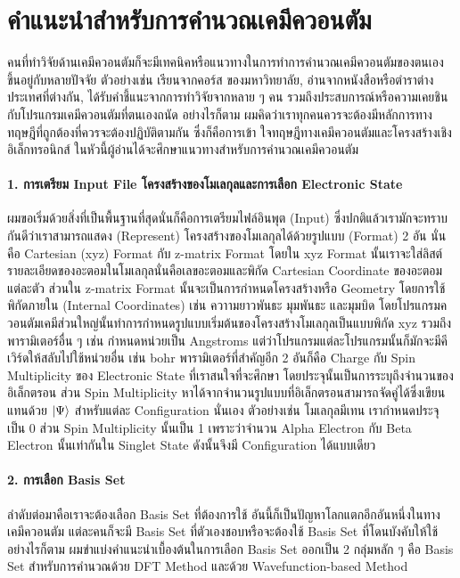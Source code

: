 \section{คำแนะนำสำหรับการคำนวณเคมีควอนตัม}

คนที่ทำวิจัยด้านเคมีควอนตัมก็จะมีเทคนิคหรือแนวทางในการทำการคำนวณเคมีควอนตัมของตนเอง ขึ้นอยู่กับหลายปัจจัย ตัวอย่างเช่น เรียนจากคอร์ส%
ของมหาวิทยาลัย, อ่านจากหนังสือหรือตำราต่างประเทศที่ต่างกัน, ได้รับคำชี้แนะจากการทำวิจัยจากหลาย ๆ คน รวมถึงประสบการณ์หรือความเคยชิน%
กับโปรแกรมเคมีควอนตัมที่ตนเองถนัด อย่างไรก็ตาม ผมคิดว่าเราทุกคนควรจะต้องมีหลักการทางทฤษฎีที่ถูกต้องที่ควรจะต้องปฏิบัติตามกัน ซึ่งก็คือการเข้า%
ใจทฤษฎีทางเคมีควอนตัมและโครงสร้างเชิงอิเล็กทรอนิกส์ ในหัวนี้ผู้อ่านได้จะศึกษาแนวทางสำหรับการคำนวณเคมีควอนตัม

\paragraph{1. การเตรียม Input File โครงสร้างของโมเลกุลและการเลือก Electronic State}
ผมขอเริ่มด้วยสิ่งที่เป็นพื้นฐานที่สุดนั่นก็คือการเตรียมไฟล์อินพุต (Input) ซึ่งปกติแล้วเรามักจะทราบกันดีว่าเราสามารถแสดง (Represent)
โครงสร้างของโมเลกุลได้ด้วยรูปแบบ (Format) 2 อัน นั่นคือ Cartesian (xyz) Format กับ z-matrix Format โดยใน xyz Format
นั้นเราจะใส่ลิสต์รายละเอียดของอะตอมในโมเลกุลนั่นคือเลขอะตอมและพิกัด Cartesian Coordinate ของอะตอมแต่ละตัว ส่วนใน z-matrix
Format นั้นจะเป็นการกำหนดโครงสร้างหรือ Geometry โดยการใช้พิกัดภายใน (Internal Coordinates) เช่น ควาามยาวพันธะ มุมพันธะ
และมุมบิด โดยโปรแกรมควอนตัมเคมีส่วนใหญ่นั้นทำการกำหนดรูปแบบเริ่มต้นของโครงสร้างโมเลกุลเป็นแบบพิกัด xyz รวมถึงพารามิเตอร์อื่น ๆ
เช่น กำหนดหน่วยเป็น Angstroms แต่ว่าโปรแกรมแต่ละโปรแกรมนั้นก็มักจะมีคีเวิร์ดให้สลับไปใช้หน่วยอื่น เช่น bohr พารามิเตอร์ที่สำคัญอีก 2
อันก็คือ Charge กับ Spin Multiplicity ของ Electronic State ที่เราสนใจที่จะศึกษา โดยประจุนั้นเป็นการระบุถึงจำนวนของอิเล็กตรอน
ส่วน Spin Multiplicity หาได้จากจำนวนรูปแบบที่อิเล็กตรอนสามารถจัดคู่ได้ซึ่งเขียนแทนด้วย $\ket{\Psi}$ สำหรับแต่ละ Configuration
นั่นเอง ตัวอย่างเช่น โมเลกุลมีเทน  เรากำหนดประจุเป็น 0 ส่วน Spin Multiplicity นั้นเป็น 1 เพราะว่าจำนวน Alpha Electron
กับ Beta Electron นั้นเท่ากันใน Singlet State ดังนั้นจึงมี Configuration ได้แบบเดียว

\paragraph{2. การเลือก Basis Set}
ลำดับต่อมาคือเราจะต้องเลือก Basis Set ที่ต้องการใช้ อันนี้ก็เป็นปัญหาโลกแตกอีกอันหนึ่งในทางเคมีควอนตัม แต่ละคนก็จะมี Basis Set
ที่ตัวเองชอบหรือจะต้องใช้ Basis Set ที่โดนบังคับให้ใช้ อย่างไรก็ตาม ผมขำแบ่งคำแนะนำเบื้องต้นในการเลือก Basis Set ออกเป็น 2 กลุ่มหลัก ๆ
คือ Basis Set สำหรับการคำนวณด้วย DFT Method และด้วย Wavefunction-based Method

